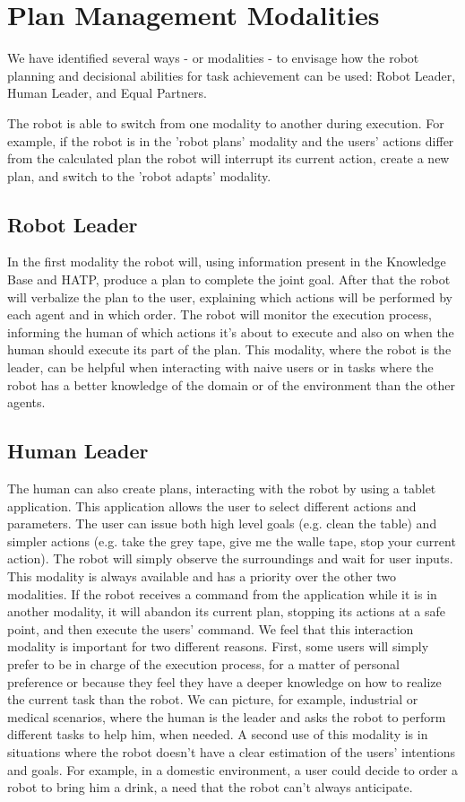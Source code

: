 \section{Plan Management Modalities}
We have identified several ways - or modalities - to envisage how the robot planning and decisional abilities
for task achievement can be used: Robot Leader, Human Leader, and Equal Partners.

The robot is able to switch from one modality to another during
execution. For example, if the robot is in the 'robot plans' modality and the users' actions differ from the calculated plan the robot will
interrupt its current action, create a new plan, and switch to the 'robot adapts' modality.  


\subsection{Robot Leader}
In the first modality the robot will, using information present in the
Knowledge Base and HATP, produce a plan to complete the joint
goal. After that the robot will verbalize the plan to the user,
explaining which actions will be performed by each agent and in which
order. The robot will monitor the execution process, informing the
human of which actions it's about to execute and also on when the human
should execute its part of the plan. This modality, where the robot is
the leader, can be helpful when interacting with
naive users or in tasks where the robot has a better knowledge of the
domain or of the environment than the other agents.

\subsection{Human Leader}
The human can also create plans, interacting with the robot by using a
tablet application. This application allows the user to select
different actions and parameters. The user can issue both high level goals (e.g. clean the
table) and simpler actions (e.g. take the grey tape, give me the walle
tape, stop your current action). The robot will simply observe the
surroundings and wait for user inputs. This modality is always available and has a priority over
the other two modalities. If the robot receives a command from the
application while it is in another modality, it will abandon its current
plan, stopping its actions at a safe point, and then execute the users'
command. We feel that this interaction modality is important for two
different reasons.  First, some users will simply prefer to be in
charge of the execution process, for a matter of personal preference or because they
feel they have a deeper knowledge on how to realize the current task
than the robot. We can picture, for example, industrial or medical
scenarios, where the human is the leader and asks the robot to perform
different tasks to help him, when needed. A second use of this modality is in situations where
the robot doesn't have  a clear estimation of the users' intentions and
goals. For example, in a domestic environment, a user could decide to
order a robot to bring him a drink, a need that the robot can't always anticipate.

